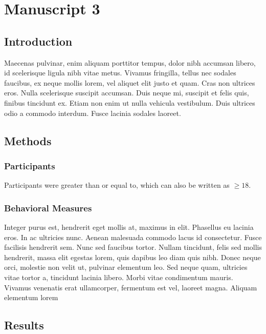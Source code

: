 \chapter{Manuscript 3}\label{chap:manuscript_3}


\section{Introduction}

Maecenas pulvinar, enim aliquam porttitor tempus, dolor nibh accumsan libero, id scelerisque ligula nibh vitae metus. Vivamus fringilla, tellus nec sodales faucibus, ex neque mollis lorem, vel aliquet elit justo et quam. Cras non ultrices eros. Nulla scelerisque suscipit accumsan. Duis neque mi, suscipit et felis quis, finibus tincidunt ex. Etiam non enim ut nulla vehicula vestibulum. Duis ultrices odio a commodo interdum. Fusce lacinia sodales laoreet.

\section{Methods}

\subsection*{Participants}

Participants were greater than or equal to, which can also be written as $\geq 18$.

\subsection*{Behavioral Measures}

Integer purus est, hendrerit eget mollis at, maximus in elit. Phasellus eu lacinia eros. In ac ultricies nunc. Aenean malesuada commodo lacus id consectetur. Fusce facilisis hendrerit sem. Nunc sed faucibus tortor. Nullam tincidunt, felis sed mollis hendrerit, massa elit egestas lorem, quis dapibus leo diam quis nibh. Donec neque orci, molestie non velit ut, pulvinar elementum leo. Sed neque quam, ultricies vitae tortor a, tincidunt lacinia libero. Morbi vitae condimentum mauris. Vivamus venenatis erat ullamcorper, fermentum est vel, laoreet magna. Aliquam elementum lorem

\section{Results}

